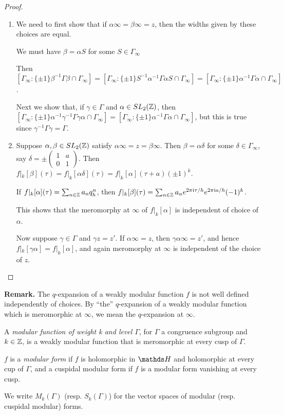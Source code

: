 \documentclass[10pt,a4paper]{article}
\begin{document}
\begin{proof}\hspace*{0cm}
  \begin{enumerate}
    \item We need to first show that if $\alpha\infty = \beta\infty = z$, then the widths given by these choices are equal.

    We must have $\beta = \alpha S$ for some $S \in \Gamma_\infty$

    Then $[\Gamma_\infty:\{\pm 1\}\beta^{-1}\Gamma\beta \cap \Gamma_\infty] = [\Gamma_\infty : \{\pm 1\}S^{-1}\alpha^{-1}\Gamma \alpha S \cap \Gamma_\infty] = [\Gamma_\infty : \{\pm 1\}\alpha^{-1}\Gamma \alpha \cap \Gamma_\infty]$.

    Next we show that, if $\gamma \in \Gamma$ and $\alpha \in SL_2(\mathbb{Z})$, then $[\Gamma_\infty : \{\pm 1\}\alpha^{-1}\gamma^{-1}\Gamma \gamma \alpha\cap \Gamma_\infty] = [\Gamma_\infty:\{\pm 1\}\alpha^{-1}\Gamma \alpha \cap \Gamma_\infty]$, but this is true since $\gamma^{-1}\Gamma \gamma = \Gamma$.

    \item Suppose $\alpha, \beta \in SL_2(\mathbb{Z})$ satisfy $\alpha \infty = z = \beta \infty$. Then $\beta = \alpha \delta$ for some $\delta \in \Gamma_\infty$, say $\delta = \pm \begin{pmatrix} 1 & a \\ 0 & 1\end{pmatrix}$. Then $f|_k[\beta](\tau) = f|_k[\alpha\delta](\tau) = f|_k[\alpha](\tau+a)(\pm 1)^{k}$.

    If $f|_k[\alpha](\tau) = \sum_{n \in \mathbb{Z}}a_n q_h^n$, then $f|_k[\beta](\tau) = \sum_{n \in \mathbb{Z}}a_n e^{2\pi\mathfrak{i}\tau/h}e^{2\pi\mathfrak{i} a/h}(-1)^k$.

    This shows that the meromorphy at $\infty$ of $f|_k[\alpha]$ is independent of choice of $\alpha$.

    Now suppose $\gamma \in \Gamma$ and $\gamma z = z'$. If $\alpha \infty = z$, then $\gamma \alpha \infty = z'$, and hence $f|_k[\gamma\alpha] = f|_k[\alpha]$, and again meromorphy at $\infty$ is independent of the choice of $z$.
  \end{enumerate}
\end{proof}
\textbf{Remark.} The $q$-expansion of a weakly modular function $f$ is not well defined independently of choices. By ``the'' $q$-expansion of a weakly modular function which is meromorphic at $\infty$, we mean the $q$-expansion at $\infty$.
\begin{definition}
  A \emph{modular function of weight k and level $\Gamma$}, for $\Gamma$ a congruence subgroup and $k \in \mathbb{Z}$, is a weakly modular function that is meromorphic at every cusp of $\Gamma$.

  $f$ is a \emph{modular form} if $f$ is holomorphic in $\H$ and holomorphic at every cup of $\Gamma$, and a cuspidal modular form if $f$ is a modular form vanishing at every cusp.

  We write $M_k(\Gamma)$ (resp. $S_k(\Gamma)$) for the vector spaces of modular (resp. cuspidal modular) forms.
\end{definition}
\end{document}
